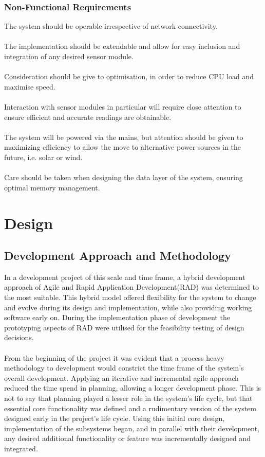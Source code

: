 \documentclass{article}
\begin{document}
\subsubsection{Non-Functional Requirements}
The system should be operable irrespective of network connectivity. \\\\ The implementation should be extendable and allow for easy inclusion and integration of any desired sensor module. \\\\ Consideration should be give to optimisation, in order to reduce CPU load and maximise speed. \\\\ Interaction with sensor modules in particular will require close attention to ensure efficient and accurate readings are obtainable. \\\\ The system will be powered via the mains, but attention should be given to maximizing efficiency to allow the move to alternative power sources in the future, i.e. solar or wind. \\\\ Care should be taken when designing the data layer of the system, ensuring optimal memory management.

\newpage
\section{Design}
\subsection{Development Approach and Methodology}
In a development project of this scale and time frame, a hybrid development approach of Agile and Rapid Application Development(RAD) was determined to the most suitable. This hybrid model offered flexibility for the system to change and evolve during its design and implementation, while also providing working software early on. During the implementation phase of development the prototyping aspects of RAD were utilised for the feasibility testing of design decisions. \\\\
From the beginning of the project it was evident that a process heavy methodology to development would constrict the time frame of the system’s overall development. Applying an iterative and incremental agile approach reduced the time spend in planning, allowing a longer development phase. This is not to say that planning played a lesser role in the system’s life cycle, but that essential core functionality was defined and a rudimentary version of the system designed early in the project\rq s life cycle. Using this initial core design, implementation of the subsystems began, and in parallel with their development, any desired additional functionality or feature was incrementally designed and integrated.
\end{document}
